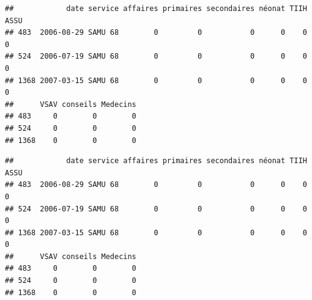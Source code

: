 \documentclass[]{article}
\newenvironment{Shaded}{\begin{snugshade}}{\end{snugshade}}
\newcommand{\KeywordTok}[1]{\textcolor[rgb]{0.13,0.29,0.53}{\textbf{{#1}}}}
\newcommand{\DataTypeTok}[1]{\textcolor[rgb]{0.13,0.29,0.53}{{#1}}}
\newcommand{\StringTok}[1]{\textcolor[rgb]{0.31,0.60,0.02}{{#1}}}
\newcommand{\NormalTok}[1]{{#1}}
\begin{document}
\begin{Shaded}
\end{Shaded}

\begin{verbatim}
##            date service affaires primaires secondaires néonat TIIH ASSU
## 483  2006-08-29 SAMU 68        0         0           0      0    0    0
## 524  2006-07-19 SAMU 68        0         0           0      0    0    0
## 1368 2007-03-15 SAMU 68        0         0           0      0    0    0
##      VSAV conseils Medecins
## 483     0        0        0
## 524     0        0        0
## 1368    0        0        0
\end{verbatim}

\begin{Shaded}
\end{Shaded}

\begin{verbatim}
##            date service affaires primaires secondaires néonat TIIH ASSU
## 483  2006-08-29 SAMU 68        0         0           0      0    0    0
## 524  2006-07-19 SAMU 68        0         0           0      0    0    0
## 1368 2007-03-15 SAMU 68        0         0           0      0    0    0
##      VSAV conseils Medecins
## 483     0        0        0
## 524     0        0        0
## 1368    0        0        0
\end{verbatim}

\begin{Shaded}
\end{Shaded}
\end{document}
